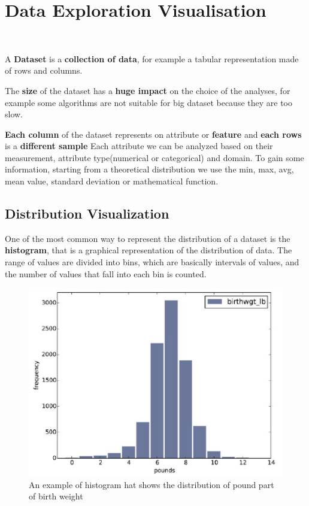 \chapter{Data Exploration Visualisation}\
\begin{boxH}
  A \textbf{Dataset} is a \textbf{collection of data}, for example a tabular
  representation made of rows and columns. 
\end{boxH}
The \textbf{size} of the dataset has a \textbf{huge impact} on the choice of
the analyses, for example some algorithms are not suitable for big dataset 
because they are too slow. 

\textbf{Each column} of the dataset represents on attribute or \textbf{feature}
and \textbf{each rows} is a \textbf{different sample}
Each attribute we can be analyzed based on their measurement, attribute
type(numerical or categorical) and domain. To gain some information, starting
from a theoretical distribution we use the min, max, avg, mean value, standard
deviation or mathematical function.

\section{Distribution Visualization}
One of the most common way to represent the distribution of a dataset is the
\textbf{histogram}, that is a graphical representation of the distribution of
data. The range of values are divided into bins, which are basically intervals
of values, and the number of values that fall into each bin is counted. 
\begin{figure}[H]
  \centering
  \includegraphics[scale=.60]{images/DataExplVis/hist.png}
  \caption{An example of histogram hat shows the distribution of pound part
  of birth weight}
  \label{fig:hists}
\end{figure}
